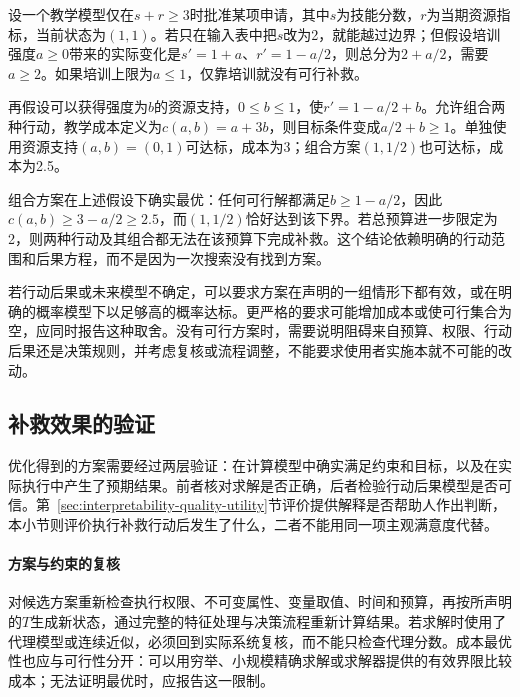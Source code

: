 \begin{example}[约束与成本决定补救方案]
\label{ex:interpretability-causal-recourse}
设一个教学模型仅在$s+r\geq3$时批准某项申请，其中$s$为技能分数，$r$为当期资源指标，当前状态为$(1,1)$。若只在输入表中把$s$改为2，就能越过边界；但假设培训强度$a\geq0$带来的实际变化是$s'=1+a$、$r'=1-a/2$，则总分为$2+a/2$，需要$a\geq2$。如果培训上限为$a\leq1$，仅靠培训就没有可行补救。

再假设可以获得强度为$b$的资源支持，$0\leq b\leq1$，使$r'=1-a/2+b$。允许组合两种行动，教学成本定义为$c(a,b)=a+3b$，则目标条件变成$a/2+b\geq1$。单独使用资源支持$(a,b)=(0,1)$可达标，成本为3；组合方案$(1,1/2)$也可达标，成本为2.5。

组合方案在上述假设下确实最优：任何可行解都满足$b\geq1-a/2$，因此$c(a,b)\geq3-a/2\geq2.5$，而$(1,1/2)$恰好达到该下界。若总预算进一步限定为2，则两种行动及其组合都无法在该预算下完成补救。这个结论依赖明确的行动范围和后果方程，而不是因为一次搜索没有找到方案。
\end{example}

若行动后果或未来模型不确定，可以要求方案在声明的一组情形下都有效，或在明确的概率模型下以足够高的概率达标。更严格的要求可能增加成本或使可行集合为空，应同时报告这种取舍。没有可行方案时，需要说明阻碍来自预算、权限、行动后果还是决策规则，并考虑复核或流程调整，不能要求使用者实施本就不可能的改动。

\subsection{补救效果的验证}
\label{sec:interpretability-recourse-validation}

优化得到的方案需要经过两层验证：在计算模型中确实满足约束和目标，以及在实际执行中产生了预期结果。前者核对求解是否正确，后者检验行动后果模型是否可信。第~\ref{sec:interpretability-quality-utility}节评价提供解释是否帮助人作出判断，本小节则评价执行补救行动后发生了什么，二者不能用同一项主观满意度代替。

\paragraph{方案与约束的复核}

对候选方案重新检查执行权限、不可变属性、变量取值、时间和预算，再按所声明的$T$生成新状态，通过完整的特征处理与决策流程重新计算结果。若求解时使用了代理模型或连续近似，必须回到实际系统复核，而不能只检查代理分数。成本最优性也应与可行性分开：可以用穷举、小规模精确求解或求解器提供的有效界限比较成本；无法证明最优时，应报告这一限制。

